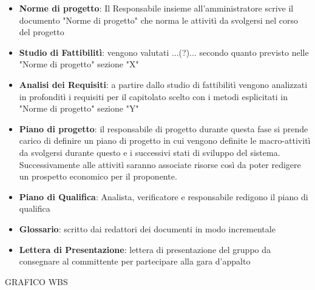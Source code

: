 \begin{itemize}
\item \textbf{Norme di progetto}: Il Responsabile insieme all'amministratore scrive il documento "Norme di progetto" che norma le attivit\`{i} da svolgersi nel corso del progetto
\item \textbf{Studio di Fattibilit\`{i}}: vengono valutati ...(?)... secondo quanto previsto nelle "Norme di progetto" sezione "X"
\item \textbf{Analisi dei Requisiti}: a partire dallo studio di fattibilit\`{i} vengono analizzati in profondit\`{i} i requisiti per il capitolato scelto con i metodi esplicitati in "Norme di progetto" sezione "Y"
\item \textbf{Piano di progetto}: il responsabile di progetto durante questa fase si prende carico di definire un piano di progetto in cui vengono definite le macro-attivit\`{i} da svolgersi durante questo e i successivi stati di sviluppo del sistema. Successivamente alle attivit\`{i} saranno associate risorse cos\`{i} da poter redigere un prospetto economico per il proponente.
\item \textbf{Piano di Qualifica}: Analista, verificatore e responsabile redigono il piano di qualifica
\item \textbf{Glossario}: scritto dai redattori dei documenti in modo incrementale 
\item \textbf{Lettera di Presentazione}: lettera di presentazione del gruppo da consegnare al committente per partecipare alla gara d'appalto
\end{itemize}



GRAFICO WBS

